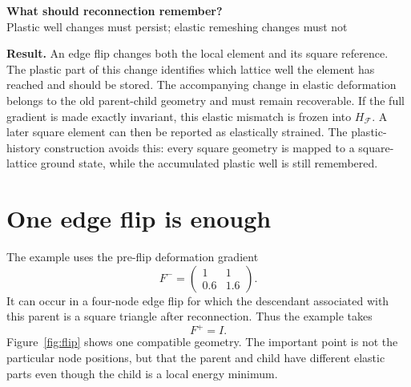 \documentclass[9pt,a4paper]{extarticle}
\newcommand{\Fminus}{F^-}
\newcommand{\Fplus}{F^+}
\newcommand{\Hf}{H_{\mathcal F}}
\begin{document}
\begin{center}
  {\LARGE\bfseries What should reconnection remember?}\\[0.3em]
  {\large Plastic well changes must persist; elastic remeshing changes must not}
\end{center}

\begin{center}
\begin{minipage}{0.94\linewidth}
\colorbox{panel}{%
\parbox{0.95\linewidth}{%
\textbf{Result.}
An edge flip changes both the local element and its square reference.  The
plastic part of this change identifies which lattice well the element has
reached and should be stored.  The accompanying change in elastic deformation
belongs to the old parent-child geometry and must remain recoverable.  If the
full gradient is made exactly invariant, this elastic mismatch is frozen into
$\Hf$.  A later square element can then be reported as elastically strained.
The plastic-history construction avoids this: every square geometry is mapped
to a square-lattice ground state, while the accumulated plastic well is still
remembered.}}
\end{minipage}
\end{center}

\section{One edge flip is enough}

The example uses the pre-flip deformation gradient
\begin{equation}
\Fminus=
\begin{pmatrix}1&1\\0.6&1.6\end{pmatrix}.
\label{eq:Fminus}
\end{equation}
It can occur in a four-node edge flip for which the descendant associated with
this parent is a square triangle after reconnection.  Thus the example takes
\begin{equation}
\Fplus=I.
\label{eq:Fplus}
\end{equation}
Figure~\ref{fig:flip} shows one compatible geometry.  The important point is
not the particular node positions, but that the parent and child have different
elastic parts even though the child is a local energy minimum.
\end{document}
